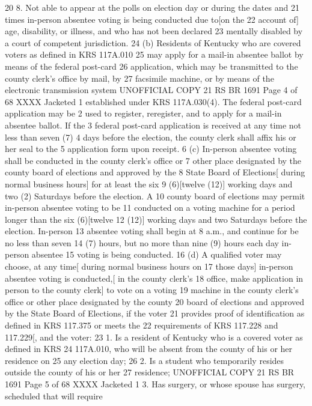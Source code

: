 20 8. Not able to appear at the polls on election day or during the dates and
21 times in-person absentee voting is being conducted due to[on the
22 account of] age, disability, or illness, and who has not been declared
23 mentally disabled by a court of competent jurisdiction.
24 (b) Residents of Kentucky who are covered voters as defined in KRS 117A.010
25 may apply for a mail-in absentee ballot by means of the federal post-card
26 application, which may be transmitted to the county clerk's office by mail, by
27 facsimile machine, or by means of the electronic transmission system 
UNOFFICIAL COPY 21 RS BR 1691
Page 4 of 68
XXXX Jacketed
1 established under KRS 117A.030(4). The federal post-card application may be
2 used to register, reregister, and to apply for a mail-in absentee ballot. If the
3 federal post-card application is received at any time not less than seven (7)
4 days before the election, the county clerk shall affix his or her seal to the
5 application form upon receipt.
6 (c) In-person absentee voting shall be conducted in the county clerk's office or
7 other place designated by the county board of elections and approved by the
8 State Board of Elections[ during normal business hours] for at least the six
9 (6)[twelve (12)] working days and two (2) Saturdays before the election. A
10 county board of elections may permit in-person absentee voting to be
11 conducted on a voting machine for a period longer than the six (6)[twelve
12 (12)] working days and two Saturdays before the election. In-person
13 absentee voting shall begin at 8 a.m., and continue for be no less than seven
14 (7) hours, but no more than nine (9) hours each day in-person absentee
15 voting is being conducted.
16 (d) A qualified voter may choose, at any time[ during normal business hours on
17 those days] in-person absentee voting is conducted,[ in the county clerk's
18 office, make application in person to the county clerk] to vote on a voting
19 machine in the county clerk's office or other place designated by the county
20 board of elections and approved by the State Board of Elections, if the voter
21 provides proof of identification as defined in KRS 117.375 or meets the
22 requirements of KRS 117.228 and 117.229[, and the voter:
23 1. Is a resident of Kentucky who is a covered voter as defined in KRS
24 117A.010, who will be absent from the county of his or her residence on
25 any election day;
26 2. Is a student who temporarily resides outside the county of his or her
27 residence;
UNOFFICIAL COPY 21 RS BR 1691
Page 5 of 68
XXXX Jacketed
1 3. Has surgery, or whose spouse has surgery, scheduled that will require
